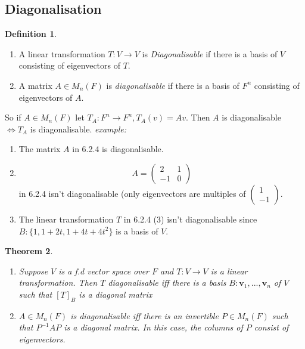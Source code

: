 \documentclass{report}
\newtheorem{theorem}{Theorem}[subsection]
\theoremstyle{remark}
\theoremstyle{definition}
\newtheorem{definition}[theorem]{Definition}
\theoremstyle{definition}
\theoremstyle{theorem}
\renewcommand{\v}[1]{\mathbf{#1}}
\providecommand{\vectii}[2]{\begin{pmatrix}#1\\#2\end{pmatrix}}
\begin{document}
\subsection{Diagonalisation}
\begin{definition}
\begin{enumerate}[label=(\arabic*)]
    \item A linear transformation $T:V\rightarrow V$ is \emph{Diagonalisable} if there is a basis of $V$ consisting of eigenvectors of $T$.
    \item A matrix $A \in M_n(F)$ is \emph{diagonalisable} if there is a basis of $F^n$ consisting of eigenvectors of $A$.
\end{enumerate}
\end{definition}
So if $A \in M_n(F)$ let $T_A:F^n\rightarrow F^n, T_A(v)=Av$. Then $A$ is diagonalisable $\iff T_A$ is diagonalisable. 
\emph{example:}
\begin{enumerate}[label=\arabic*)]
    \item The matrix $A$ in 6.2.4 is diagonalisable.
    \item \[A = \begin{pmatrix}
    2&1\\-1&0
    \end{pmatrix}\]
    in 6.2.4 isn't diagonalisable (only eigenvectors are multiples of $\vectii{1}{-1}$.
    \item The linear transformation $T$ in 6.2.4 (3) isn't diagonalisable since $B: \{1,1+2t,1+4t+4t^2\}$ is a basis of $V$.
\end{enumerate}
\begin{theorem}
\begin{enumerate}[label=(\arabic*)]
    \item Suppose $V$ is a f.d vector space over $F$ and $T:V\rightarrow V$ is a linear transformation. Then $T$ diagonalisable iff there is a basis $B: \v{v}_1,...,\v{v}_n$ of $V$ such that $[T]_B$ is a diagonal matrix
    \item $A \in M_n(F)$ is diagonalisable iff there is an invertible $P \in M_n(F)$ such that $P^{-1}AP$ is a diagonal matrix. In this case, the columns of $P$ consist of eigenvectors.
    
\end{enumerate}
\end{theorem}
\end{document}
